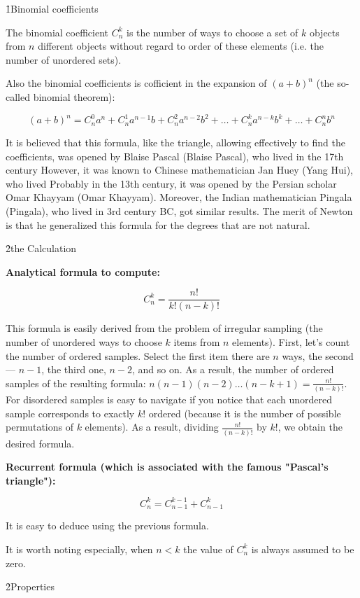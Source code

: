 \h1{Binomial coefficients}

The binomial coefficient $C_n^k$ is the number of ways to choose a set of $k$ objects from $n$ different objects without regard to order of these elements (i.e. the number of unordered sets).

Also the binomial coefficients is cofficient in the expansion of $(a+b)^n$ (the so-called binomial theorem):

$$ (a+b)^n = C_n^0 a^n + C_n^1 a^{n-1} b + C_n^2 a^{n-2} b^2 + \ldots + C_n^k a^{n-k} b^k + \ldots + C_n^n b^n $$

It is believed that this formula, like the triangle, allowing effectively to find the coefficients, was opened by Blaise Pascal (Blaise Pascal), who lived in the 17th century However, it was known to Chinese mathematician Jan Huey (Yang Hui), who lived Probably in the 13th century, it was opened by the Persian scholar Omar Khayyam (Omar Khayyam). Moreover, the Indian mathematician Pingala (Pingala), who lived in 3rd century BC, got similar results. The merit of Newton is that he generalized this formula for the degrees that are not natural.

\h2{the Calculation}

\bf{Analytical formula} to compute:

$$ C_n^k = \frac{n!}{k! (n-k)!} $$

This formula is easily derived from the problem of irregular sampling (the number of unordered ways to choose $k$ items from $n$ elements). First, let's count the number of ordered samples. Select the first item there are $n$ ways, the second --- $n-1$, the third one, $n-2$, and so on. As a result, the number of ordered samples of the resulting formula: $ n (n-1) (n-2) \ldots (n-k+1) = \frac{n!}{(n-k)!} $. For disordered samples is easy to navigate if you notice that each unordered sample corresponds to exactly $k!$ ordered (because it is the number of possible permutations of $k$ elements). As a result, dividing $\frac{n!}{(n-k)!}$ by $k!$, we obtain the desired formula.

\bf{Recurrent formula} (which is associated with the famous "Pascal's triangle"):

$$ C_n^k = C_{n-1}^{k-1} + C_{n-1}^k $$

It is easy to deduce using the previous formula.

It is worth noting especially, when $n<k$ the value of $C_n^k$ is always assumed to be zero.

\h2{Properties}

